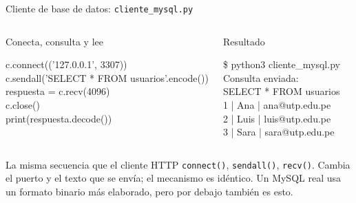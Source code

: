 \documentclass[aspectratio=169,10pt,c]{beamer}
\begin{document}
\begin{frame}{Cliente de base de datos: \texttt{cliente\_mysql.py}}
\begin{columns}[T,onlytextwidth]
\begin{exampleblock}{Conecta, consulta y lee}
\begin{terminal}\scriptsize
c.connect(('127.0.0.1', 3307))\\
c.sendall('SELECT * FROM usuarios'.encode())\\
respuesta = c.recv(4096)\\
c.close()\\
print(respuesta.decode())
\end{terminal}
\end{exampleblock}
\begin{exampleblock}{Resultado}
\begin{terminal}\footnotesize
\$ python3 cliente\_mysql.py\\
Consulta enviada:\\
SELECT * FROM usuarios\\
1 | Ana | ana@utp.edu.pe\\
2 | Luis | luis@utp.edu.pe\\
3 | Sara | sara@utp.edu.pe
\end{terminal}
\end{exampleblock}
\end{columns}
\begin{block}{La misma secuencia que el cliente HTTP}
\small \texttt{connect()}, \texttt{sendall()}, \texttt{recv()}. Cambia el puerto y el texto que se envía; el mecanismo es idéntico. Un MySQL real usa un formato binario más elaborado, pero por debajo también es esto.
\end{block}
\end{frame}
\end{document}
